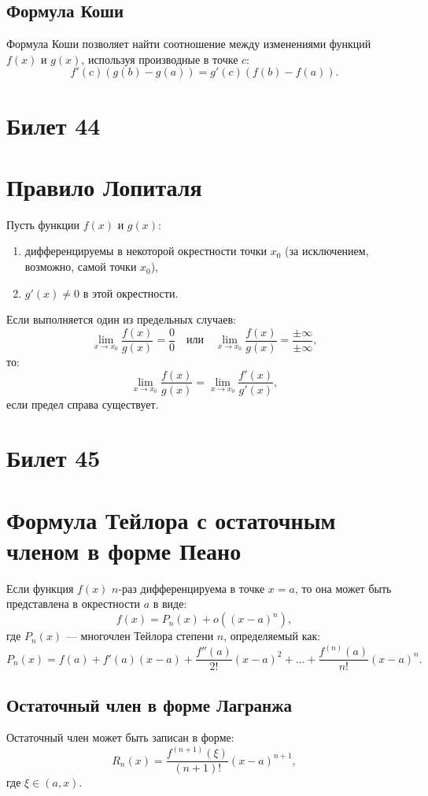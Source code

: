 \documentclass{article}
\begin{document}
\subsection*{Формула Коши}
Формула Коши позволяет найти соотношение между изменениями функций \( f(x) \) и \( g(x) \), используя производные в точке \( c \):
\[
f'(c) (g(b) - g(a)) = g'(c) (f(b) - f(a)).
\]

\section{Билет 44}

\section*{Правило Лопиталя}
Пусть функции \( f(x) \) и \( g(x) \):
\begin{enumerate}
    \item дифференцируемы в некоторой окрестности точки \( x_0 \) (за исключением, возможно, самой точки \( x_0 \)),
    \item \( g'(x) \neq 0 \) в этой окрестности.
\end{enumerate}
Если выполняется один из предельных случаев:
\[
\lim_{x \to x_0} \frac{f(x)}{g(x)} = \frac{0}{0} \quad \text{или} \quad \lim_{x \to x_0} \frac{f(x)}{g(x)} = \frac{\pm \infty}{\pm \infty},
\]
то:
\[
\lim_{x \to x_0} \frac{f(x)}{g(x)} = \lim_{x \to x_0} \frac{f'(x)}{g'(x)},
\]
если предел справа существует.

\section{Билет 45}

\section*{Формула Тейлора с остаточным членом в форме Пеано}
Если функция \( f(x) \) \( n \)-раз дифференцируема в точке \( x = a \), то она может быть представлена в окрестности \( a \) в виде:
\[
f(x) = P_n(x) + o((x-a)^n),
\]
где \( P_n(x) \) — многочлен Тейлора степени \( n \), определяемый как:
\[
P_n(x) = f(a) + f'(a)(x-a) + \frac{f''(a)}{2!}(x-a)^2 + \dots + \frac{f^{(n)}(a)}{n!}(x-a)^n.
\]

\subsection*{Остаточный член в форме Лагранжа}
Остаточный член может быть записан в форме:
\[
R_n(x) = \frac{f^{(n+1)}(\xi)}{(n+1)!}(x-a)^{n+1},
\]
где \( \xi \in (a, x) \).
\end{document}
